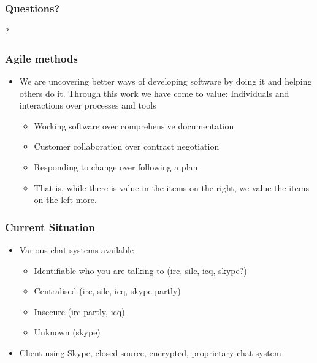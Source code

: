 \documentclass{beamer}
\begin{document}
\frame
{
  \frametitle{Questions?}
  \begin{center}
  ?
  \end{center}
}


\frame
{
  \frametitle{Agile methods}
  \begin{itemize}
    \item 
      We are uncovering better ways of developing software by doing it and helping others do it. Through this work we have come to value:
      Individuals and interactions over processes and tools
      \begin{itemize}
      \item Working software over comprehensive documentation
      \item Customer collaboration over contract negotiation
      \item Responding to change over following a plan
      \item That is, while there is value in the items on the right, we value the items on the left more.
      \end{itemize}
  \end{itemize}
}


\frame
{
  \frametitle{Current Situation}
  \begin{itemize}
      \item Various chat systems available
      \begin{itemize}
          \item Identifiable who you are talking to (irc, silc, icq, skype?)
          \item Centralised (irc, silc, icq, skype partly)
          \item Insecure (irc partly, icq)
          \item Unknown (skype)
      \end{itemize}
      \item Client using Skype, closed source, encrypted, proprietary chat system
  \end{itemize}
}

\end{document}
